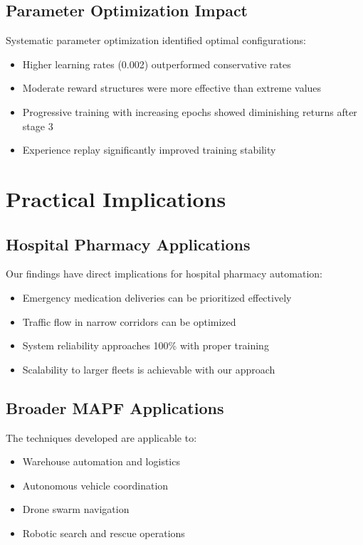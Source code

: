 \documentclass[12pt, a4paper]{report}
\begin{document}
\subsection{Parameter Optimization Impact}
Systematic parameter optimization identified optimal configurations:
\begin{itemize}
    \item Higher learning rates (0.002) outperformed conservative rates
    \item Moderate reward structures were more effective than extreme values
    \item Progressive training with increasing epochs showed diminishing returns after stage 3
    \item Experience replay significantly improved training stability
\end{itemize}

\section{Practical Implications}

\subsection{Hospital Pharmacy Applications}
Our findings have direct implications for hospital pharmacy automation:
\begin{itemize}
    \item Emergency medication deliveries can be prioritized effectively
    \item Traffic flow in narrow corridors can be optimized
    \item System reliability approaches 100\% with proper training
    \item Scalability to larger fleets is achievable with our approach
\end{itemize}

\subsection{Broader MAPF Applications}
The techniques developed are applicable to:
\begin{itemize}
    \item Warehouse automation and logistics
    \item Autonomous vehicle coordination
    \item Drone swarm navigation
    \item Robotic search and rescue operations
\end{itemize}
\end{document}
